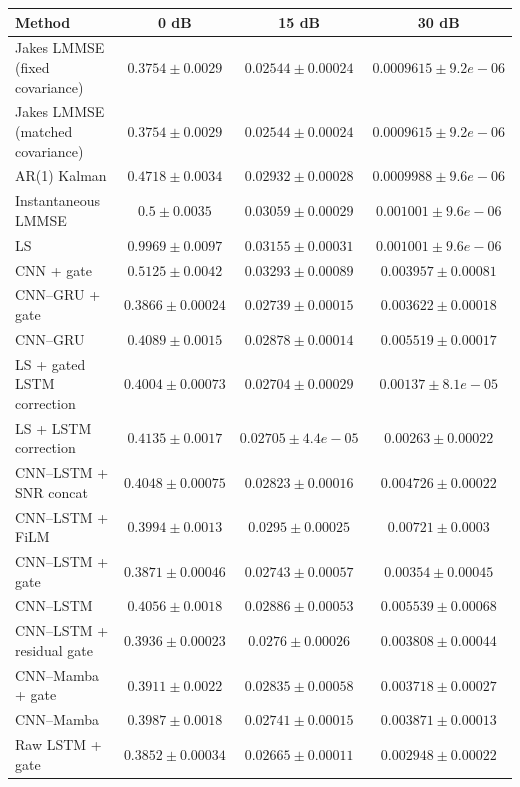 \begin{tabular}{lccc}
\hline
Method & 0 dB & 15 dB & 30 dB \\
\hline
Jakes LMMSE (fixed covariance) & $0.3754 \pm 0.0029$ & $0.02544 \pm 0.00024$ & $0.0009615 \pm 9.2e-06$ \\
Jakes LMMSE (matched covariance) & $0.3754 \pm 0.0029$ & $0.02544 \pm 0.00024$ & $0.0009615 \pm 9.2e-06$ \\
AR(1) Kalman & $0.4718 \pm 0.0034$ & $0.02932 \pm 0.00028$ & $0.0009988 \pm 9.6e-06$ \\
Instantaneous LMMSE & $0.5 \pm 0.0035$ & $0.03059 \pm 0.00029$ & $0.001001 \pm 9.6e-06$ \\
LS & $0.9969 \pm 0.0097$ & $0.03155 \pm 0.00031$ & $0.001001 \pm 9.6e-06$ \\
CNN + gate & $0.5125 \pm 0.0042$ & $0.03293 \pm 0.00089$ & $0.003957 \pm 0.00081$ \\
CNN--GRU + gate & $0.3866 \pm 0.00024$ & $0.02739 \pm 0.00015$ & $0.003622 \pm 0.00018$ \\
CNN--GRU & $0.4089 \pm 0.0015$ & $0.02878 \pm 0.00014$ & $0.005519 \pm 0.00017$ \\
LS + gated LSTM correction & $0.4004 \pm 0.00073$ & $0.02704 \pm 0.00029$ & $0.00137 \pm 8.1e-05$ \\
LS + LSTM correction & $0.4135 \pm 0.0017$ & $0.02705 \pm 4.4e-05$ & $0.00263 \pm 0.00022$ \\
CNN--LSTM + SNR concat & $0.4048 \pm 0.00075$ & $0.02823 \pm 0.00016$ & $0.004726 \pm 0.00022$ \\
CNN--LSTM + FiLM & $0.3994 \pm 0.0013$ & $0.0295 \pm 0.00025$ & $0.00721 \pm 0.0003$ \\
CNN--LSTM + gate & $0.3871 \pm 0.00046$ & $0.02743 \pm 0.00057$ & $0.00354 \pm 0.00045$ \\
CNN--LSTM & $0.4056 \pm 0.0018$ & $0.02886 \pm 0.00053$ & $0.005539 \pm 0.00068$ \\
CNN--LSTM + residual gate & $0.3936 \pm 0.00023$ & $0.0276 \pm 0.00026$ & $0.003808 \pm 0.00044$ \\
CNN--Mamba + gate & $0.3911 \pm 0.0022$ & $0.02835 \pm 0.00058$ & $0.003718 \pm 0.00027$ \\
CNN--Mamba & $0.3987 \pm 0.0018$ & $0.02741 \pm 0.00015$ & $0.003871 \pm 0.00013$ \\
Raw LSTM + gate & $0.3852 \pm 0.00034$ & $0.02665 \pm 0.00011$ & $0.002948 \pm 0.00022$ \\
\hline
\end{tabular}

